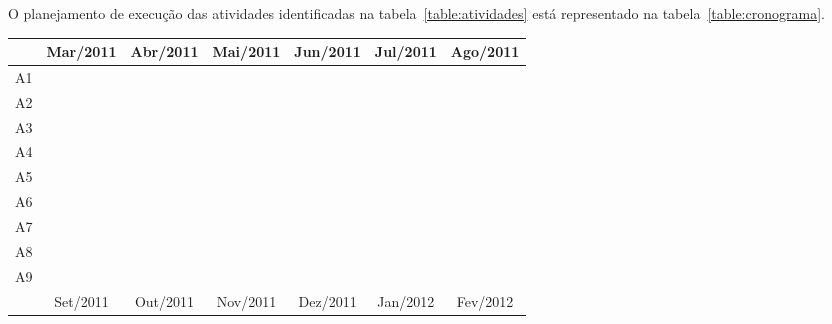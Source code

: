 \documentclass[a4paper,titlepage,12pt]{article}
\newcommand{\bc}{\cellcolor{black}}
\begin{document}

O planejamento de execução das atividades identificadas na tabela~\ref{table:atividades} está representado na tabela~\ref{table:cronograma}. 

\begin{table}[H]
\centering
\begin{tabular}{|c|c|c|c|c|c|c|c|c|c|c|c|c|c|c|c|c|c|c|c|c|c|c|c|c|}
    \hline
 & \multicolumn{4}{c|}{Mar/2011} & \multicolumn{4}{c|}{Abr/2011} & \multicolumn{4}{c|}{Mai/2011} & \multicolumn{4}{c|}{Jun/2011} & \multicolumn{4}{c|}{Jul/2011} & \multicolumn{4}{c|}{Ago/2011}\\    
	\hline
A1 & \bc & \bc & \bc & \bc & \bc & \bc & \bc & \bc &     &     &     &     &     &     &     &     &     &     &     &     &     &     &     &\\
	\hline
A2 &     &     &     &     & \bc & \bc & \bc & \bc &     &     &     &     &     &     &     &     &     & \bc & \bc & \bc &     &     &     &\\
	\hline
A3 &     &     &     &     &     &     &     & \bc & \bc & \bc & \bc & \bc &     &     &     &     &     & \bc & \bc & \bc &     &     &     &\\
	\hline
A4 &     &     &     &     &     &     &     &     &     &     & \bc & \bc & \bc & \bc &     &     &     &     & \bc & \bc & \bc & \bc &     &\\
	\hline
A5 &     &     &     &     &     &     &     &     &     &     &     &     & \bc & \bc & \bc &     &     &     &     &     & \bc & \bc & \bc &\\
	\hline
A6 &     &     &     &     &     &     &     &     &     &     &     &     &     &     & \bc & \bc & \bc & \bc &     &     &     &     & \bc & \bc\\
	\hline
A7 & \bc & \bc & \bc & \bc & \bc & \bc & \bc & \bc & \bc & \bc & \bc & \bc & \bc & \bc & \bc & \bc & \bc & \bc & \bc & \bc & \bc & \bc & \bc & \bc\\
    \hline
A8 &     &     &     &     &     &     &     &     &     &     &     &     &     &     &     &     &     &     &     &     &     &     &     &\\
    \hline
A9 &     &     &     &     &     &     &     &     &     &     &     &     &     &     &     &     &     &     &     &     &     &     &     &\\
    \hline
 & \multicolumn{4}{c|}{Set/2011} & \multicolumn{4}{c|}{Out/2011} & \multicolumn{4}{c|}{Nov/2011} & \multicolumn{4}{c|}{Dez/2011} & \multicolumn{4}{c|}{Jan/2012} & \multicolumn{4}{c|}{Fev/2012}\\    

\end{tabular}
\end{table}
\end{document}
